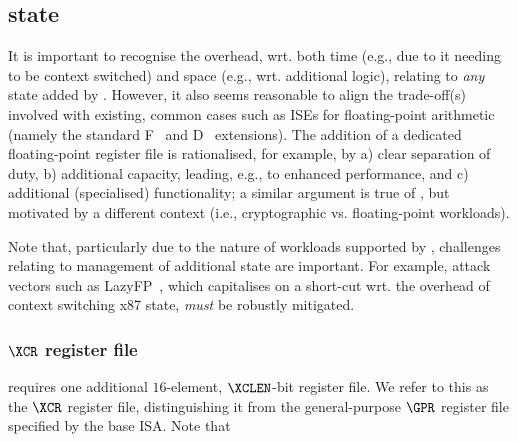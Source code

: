 \subsection{\XCID state}
\label{sec:spec:state}

It is important to recognise the overhead, wrt. both 
time  (e.g., due to it needing to be context switched) 
and 
space (e.g., wrt. additional logic),
relating to {\em any} state added by \XCID.
However, it also seems reasonable to align the trade-off(s) involved with 
existing, common cases such as ISEs for floating-point arithmetic (namely
the standard 
F~\cite[Section 8]{SCARV:RV:ISA:I:17}
and
D~\cite[Section 9]{SCARV:RV:ISA:I:17}
extensions).  The addition of a dedicated floating-point register file is
rationalised, for example, by
a) clear separation of duty,
b) additional capacity, leading, e.g., to enhanced performance,
   and
c) additional (specialised) functionality;
a similar argument is true of \XCID, but motivated by a different context
(i.e., cryptographic vs. floating-point workloads).

Note that, 
particularly due to the nature of workloads supported by \XCID,
challenges relating to management of additional state are important.  For
example, attack vectors such as 
LazyFP~\cite{SCARV:StePre:18}, 
which capitalises on a short-cut wrt. the overhead of context switching
x87 state, {\em must} be robustly mitigated.


\subsubsection{$\XCR$ register file}
\label{sec:spec:state:xcr}

\XCID 
requires one additional 
$16$-element, $\XCLEN$-bit register file.
We refer to this as the $\XCR$ register file, distinguishing it from the
general-purpose $\GPR$ register file specified by the base ISA.
Note that

